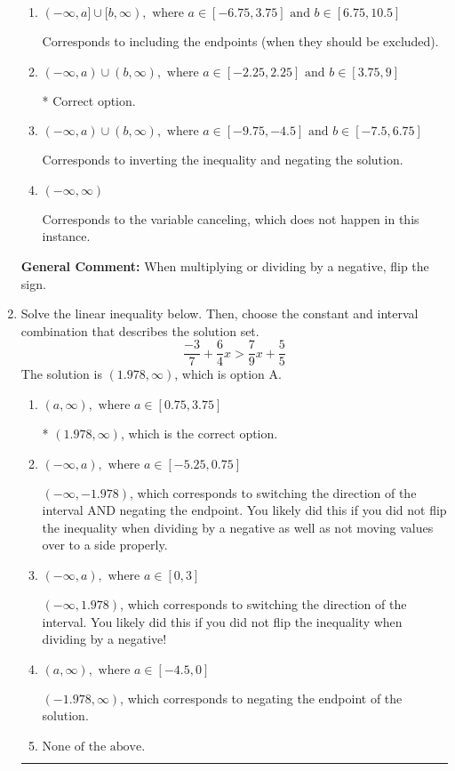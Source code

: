\documentclass{extbook}[14pt]
\newcommand{\litem}[1]{\item #1

\rule{\textwidth}{0.4pt}}
\begin{document}
\begin{enumerate}
{\begin{enumerate}[label=\Alph*.]
Corresponds to including the endpoints AND negating.
\item \( (-\infty, a] \cup [b, \infty), \text{ where } a \in [-6.75, 3.75] \text{ and } b \in [6.75, 10.5] \)

Corresponds to including the endpoints (when they should be excluded).
\item \( (-\infty, a) \cup (b, \infty), \text{ where } a \in [-2.25, 2.25] \text{ and } b \in [3.75, 9] \)

 * Correct option.
\item \( (-\infty, a) \cup (b, \infty), \text{ where } a \in [-9.75, -4.5] \text{ and } b \in [-7.5, 6.75] \)

Corresponds to inverting the inequality and negating the solution.
\item \( (-\infty, \infty) \)

Corresponds to the variable canceling, which does not happen in this instance.
\end{enumerate}

\textbf{General Comment:} When multiplying or dividing by a negative, flip the sign.
}
\litem{
Solve the linear inequality below. Then, choose the constant and interval combination that describes the solution set.
\[ \frac{-3}{7} + \frac{6}{4} x > \frac{7}{9} x + \frac{5}{5} \]The solution is \( (1.978, \infty) \), which is option A.\begin{enumerate}[label=\Alph*.]
\item \( (a, \infty), \text{ where } a \in [0.75, 3.75] \)

* $(1.978, \infty)$, which is the correct option.
\item \( (-\infty, a), \text{ where } a \in [-5.25, 0.75] \)

 $(-\infty, -1.978)$, which corresponds to switching the direction of the interval AND negating the endpoint. You likely did this if you did not flip the inequality when dividing by a negative as well as not moving values over to a side properly.
\item \( (-\infty, a), \text{ where } a \in [0, 3] \)

 $(-\infty, 1.978)$, which corresponds to switching the direction of the interval. You likely did this if you did not flip the inequality when dividing by a negative!
\item \( (a, \infty), \text{ where } a \in [-4.5, 0] \)

 $(-1.978, \infty)$, which corresponds to negating the endpoint of the solution.
\item \( \text{None of the above}. \)


\end{enumerate}}
\end{enumerate}
\end{document}
